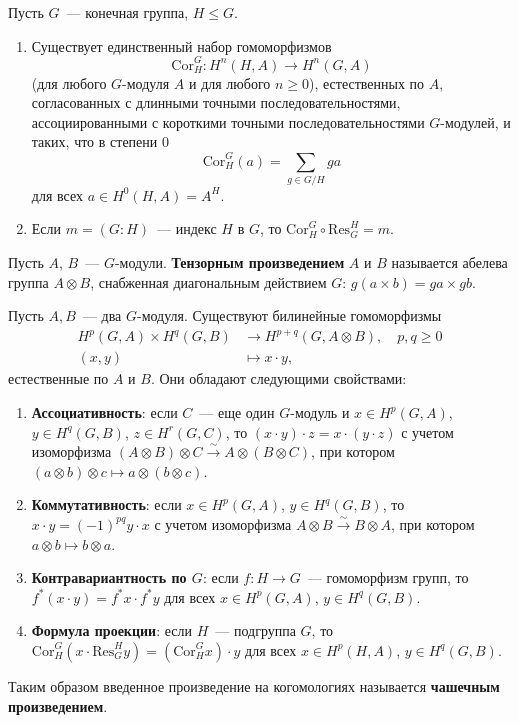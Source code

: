 \documentclass[a4paper,oneside,12pt]{article}
\theoremstyle{plain} { \swapnumbers
\newtheorem{theorem}{Теорема}[subsection]
\newtheorem{corollary}[theorem]{Следствие}
\newtheorem{lemma}[theorem]{Лемма}
\newtheorem{proposition}[theorem]{Утверждение}
\newtheorem{claim}[theorem]{Факт}
}
\theoremstyle{definition} { \swapnumbers
\newtheorem{definition}[theorem]{Определение}
\newtheorem{notation}[theorem]{Обозначение}
\newtheorem{remark}[theorem]{Замечание}
\newtheorem{remarks}[theorem]{Замечания}
\newtheorem{example}[theorem]{Пример}
\newtheorem{examples}[theorem]{Примеры}
\newtheorem{sssection}[theorem]{}
}
\def\Res{\mathrm{Res}}
\def\Cor{\mathrm{Cor}}
\begin{document}
\begin{theorem}
Пусть $G$~--- конечная группа, $H\leq G$.
\begin{enumerate}
\item Существует единственный набор гомоморфизмов
$$
\Cor^G_H\colon H^n(H,A)\to H^n(G,A)
$$
(для любого
$G$-модуля $A$ и для любого $n\geq 0$), естественных по $A$, согласованных с длинными точными последовательностями,
ассоциированными с короткими точными последовательностями $G$-модулей, и таких, что в степени 0
$$
\Cor^G_H(a)=\sum_{g\in G/H}ga
$$
для всех $a\in H^0(H,A)=A^H$.
\item Если $m=(G:H)$~--- индекс $H$ в $G$, то $\Cor^G_H\circ\Res^H_G=m$.
\end{enumerate}
\end{theorem}

\begin{definition}
Пусть $A$, $B$~--- $G$-модули. {\bf Тензорным произведением} $A$ и $B$ называется
абелева группа $A\otimes B$, снабженная диагональным действием $G$: $g(a\times b)=ga\times gb$.
\end{definition}

\begin{theorem}
Пусть $A,B$~--- два $G$-модуля. Существуют билинейные гомоморфизмы
$$
\begin{aligned}
H^p(G,A)\times H^q(G,B)&\to H^{p+q}(G,A\otimes B),\quad p,q\geq 0\\
(x,y)&\mapsto x\cdot y,
\end{aligned}
$$
естественные по $A$ и $B$. Они обладают следующими свойствами:
\begin{enumerate}
\item {\bf Ассоциативность}: если $C$~--- еще один $G$-модуль и
$x\in H^p(G,A)$, $y\in H^q(G,B)$, $z\in H^r(G,C)$, то
$(x\cdot y)\cdot z=x\cdot(y\cdot z)$ с учетом изоморфизма
$(A\otimes B)\otimes C\stackrel{\sim}{\to}A\otimes(B\otimes C)$,
при котором $(a\otimes b)\otimes c\mapsto a\otimes(b\otimes c)$.
\item {\bf Коммутативность}: если $x\in H^p(G,A)$, $y\in H^q(G,B)$,
то $x\cdot y=(-1)^{pq}y\cdot x$ с учетом изоморфизма
$A\otimes B\stackrel{\sim}{\to}B\otimes A$, при котором $a\otimes b\mapsto b\otimes a$.
\item {\bf Контравариантность по $G$}: если $f\colon H\to G$~--- гомоморфизм групп, то
$f^*(x\cdot y)=f^*x\cdot f^*y$ для всех $x\in H^p(G,A)$, $y\in H^q(G,B)$.
\item {\bf Формула проекции}: если $H$~--- подгруппа $G$, то
$\Cor^G_H(x\cdot\Res^H_G y)=(\Cor^G_Hx)\cdot y$ для всех $x\in H^p(H,A)$, $y\in H^q(G,B)$.
\end{enumerate}
Таким образом введенное произведение на когомологиях называется {\bf чашечным произведением}.
\end{theorem}
\end{document}
